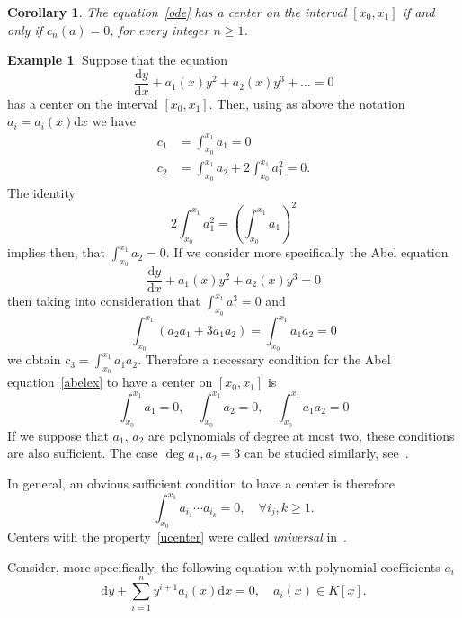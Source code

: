 \documentclass[11pt]{article}
\newtheorem{coro}[theo]{Corollary}
\theoremstyle{definition}
\newtheorem{exam}[theo]{Example}
\numberwithin{equation}{section}
\numberwithin{figure}{section}
\numberwithin{table}{section}
\newcommand*{\dd}{\mathrm{d}}
\newcommand*{\dx}{\dd x}
\newcommand*{\dy}{\dd y}
\let\oldforall\forall
\renewcommand*{\forall}{\mathrel{\oldforall}}
\begin{document}
\begin{coro}
The equation~\eqref{ode} has a center on the interval $[x_0,x_1]$ if and only if $c_n(a)=0$, for every integer $ n \geq 1$.
\end{coro}

\begin{exam}
Suppose that the equation
\[
\frac{\dy}{\dx} + a_1(x)y^2 + a_2(x)y^3 + \dots = 0
\]
has a center on the interval $[x_0,x_1]$. Then, using as above the notation $a_{i}= a_{i}(x) \dx $ we have
\begin{align*}
c_1&= \int_{x_0}^{x_1} a_1 = 0 \\
c_2& = \int_{x_0}^{x_1} a_2 + 2 \int_{x_0}^{x_1} a_1^2 = 0.
\end{align*}
The identity
\[
2 \int_{x_0}^{x_1} a_1^2 = \left(\int_{x_0}^{x_1} a_1\right)^2
\]
implies then, that $ \int_{x_0}^{x_1} a_2 = 0$.
If we consider more specifically the Abel equation
\begin{equation}\label{abelex}
\frac{\dy}{\dx} + a_1(x)y^2 + a_2(x)y^3 = 0
\end{equation}
then taking into consideration that $\int_{x_0}^{x_1} a_1^3 = 0$ and
\[
\int_{x_0}^{x_1} (a_2 a_1 + 3a_1a_2) = \int_{x_0}^{x_1} a_1 a_2 = 0
\]
we obtain $c_3= \int_{x_0}^{x_1} a_1 a_2 $. Therefore a necessary condition for the Abel equation~\eqref{abelex} to have a center on $[x_0,x_1]$ is
\begin{equation}\label{nc}
\int_{x_0}^{x_1} a_1 = 0,\quad \int_{x_0}^{x_1} a_2 = 0, \quad \int_{x_0}^{x_1} a_1 a_2 = 0
\end{equation}
If we suppose that $a_1$, $a_2$ are polynomials of degree at most two, these conditions are also sufficient. The case $\deg a_1, a_2 = 3$ can be studied similarly, see~\cite{bfy98,bfy99,bfy00}.
\end{exam}

In general, an obvious sufficient condition to have a center is therefore
\begin{equation}\label{ucenter}
\int_{x_0}^{x_1} a_{i_1} \cdots a_{i_k} = 0,\quad \forall i_j, k \geq 1.
\end{equation}
Centers with the property~\eqref{ucenter} were called \emph{universal} in~\cite{brud06}.

Consider, more specifically, the following equation with polynomial coefficients $a_i$
\begin{equation}\label{an}
\dy + \sum_{i=1}^n y^{i+1} a_i(x) \dx = 0,\quad a_i(x) \in K[x].
\end{equation}
\end{document}
